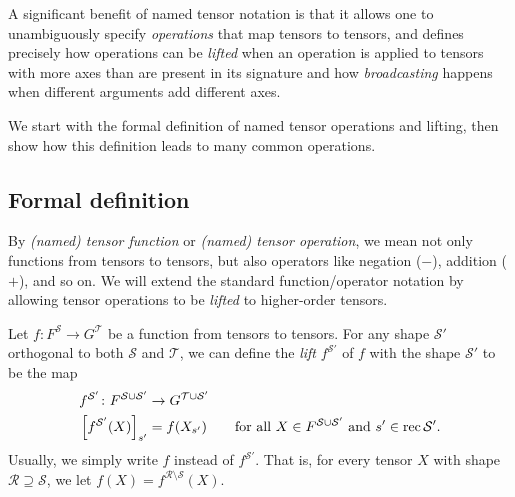 A significant benefit of named tensor notation is that it allows one to unambiguously specify \emph{operations} that map tensors to tensors, and defines precisely how operations can be \emph{lifted} when an 
operation is applied to tensors with more axes than are present in its signature and how \emph{broadcasting} happens when different arguments add different axes.

We start with the formal definition of named tensor operations and lifting, then show how this definition leads to many common operations.

\subsection{Formal definition}

By \emph{(named) tensor function} or \emph{(named) tensor operation}, we mean not only functions from tensors to tensors, but also operators like negation ($-$), addition ($+$), and so on. We will extend the standard function/operator notation by allowing tensor operations to be \emph{lifted} to higher-order tensors.

\begin{definition} \label{def:lifting}
Let $f \colon F^{\mathcal{S}} \rightarrow G^{\mathcal{T}}$ be a function from tensors to tensors. For any shape $\mathcal{S'}$ orthogonal to both $\mathcal{S}$ and $\mathcal{T}$, we can define the \emph{lift} $f^{\mathcal{S'}}$ of $f$ with the shape $\mathcal{S'}$ to be the map
\begin{align*}
f^{\mathcal{S'}} \colon F^{\mathcal{S} \cup \mathcal{S'}} &\rightarrow G^{\mathcal{T} \cup \mathcal{S'}} \\
\left[f^{\mathcal{S'}}(X)\right]_{s'} &= f(X_{s'}) \qquad \text{for all $X \in F^{\mathcal{S}\cup\mathcal{S'}}$ and  $s' \in \operatorname{rec}\mathcal{S'}$.}
\end{align*}
Usually, we simply write $f$ instead of $f^{\mathcal{S'}}$. That is, for every tensor $X$ with shape  $\mathcal{R} \supseteq \mathcal{S}$, we let $f(X) = f^{\mathcal{R} \setminus \mathcal{S}}(X)$.
\end{definition}

